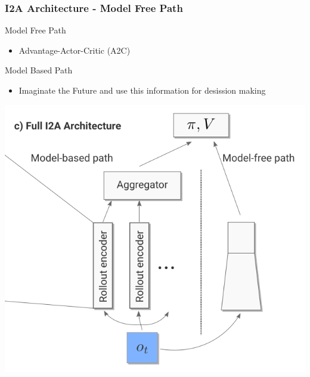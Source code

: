 \begin{frame}
    \frametitle{I2A Architecture - Model Free Path}

\begin{multicols}{2}
	\begin{PraesentationAufzaehlung}
		\item Model Free Path
		\begin{itemize}
            \item Advantage-Actor-Critic (A2C)
        \end{itemize}
	    \item Model Based Path
		\begin{itemize}
			\item Imaginate the Future and use this information for desission making
		\end{itemize}
	\end{PraesentationAufzaehlung}
    \vfill\columnbreak
    \includegraphics[width=\columnwidth, height=.7\textheight]{./Images/full_i2a_architecture.png}%
\end{multicols}
    
\end{frame}
\clearpage


